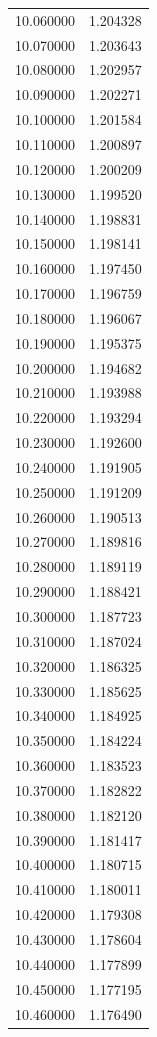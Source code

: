 \begin{tabular}{rr}
10.060000 & 1.204328 \\
10.070000 & 1.203643 \\
10.080000 & 1.202957 \\
10.090000 & 1.202271 \\
10.100000 & 1.201584 \\
10.110000 & 1.200897 \\
10.120000 & 1.200209 \\
10.130000 & 1.199520 \\
10.140000 & 1.198831 \\
10.150000 & 1.198141 \\
10.160000 & 1.197450 \\
10.170000 & 1.196759 \\
10.180000 & 1.196067 \\
10.190000 & 1.195375 \\
10.200000 & 1.194682 \\
10.210000 & 1.193988 \\
10.220000 & 1.193294 \\
10.230000 & 1.192600 \\
10.240000 & 1.191905 \\
10.250000 & 1.191209 \\
10.260000 & 1.190513 \\
10.270000 & 1.189816 \\
10.280000 & 1.189119 \\
10.290000 & 1.188421 \\
10.300000 & 1.187723 \\
10.310000 & 1.187024 \\
10.320000 & 1.186325 \\
10.330000 & 1.185625 \\
10.340000 & 1.184925 \\
10.350000 & 1.184224 \\
10.360000 & 1.183523 \\
10.370000 & 1.182822 \\
10.380000 & 1.182120 \\
10.390000 & 1.181417 \\
10.400000 & 1.180715 \\
10.410000 & 1.180011 \\
10.420000 & 1.179308 \\
10.430000 & 1.178604 \\
10.440000 & 1.177899 \\
10.450000 & 1.177195 \\
10.460000 & 1.176490 \\

\end{tabular}
